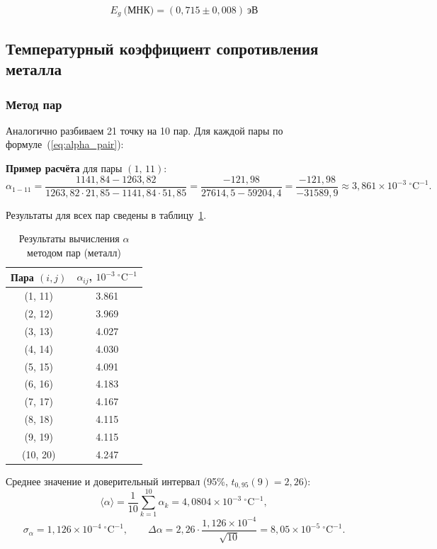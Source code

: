\documentclass[a4paper,14pt]{article}
\begin{document}
\[
    \boxed{E_g\ \text{(МНК)} = (0{,}715 \pm 0{,}008)\ \text{эВ}}
\]

\subsection{Температурный коэффициент сопротивления металла}

\subsubsection*{Метод пар}

Аналогично разбиваем 21 точку на 10 пар. Для каждой пары по формуле~(\ref{eq:alpha_pair}):

\textbf{Пример расчёта} для пары $(1,\,11)$:
\[
    \alpha_{1{-}11} = \frac{1141{,}84 - 1263{,}82}{1263{,}82 \cdot 21{,}85 - 1141{,}84 \cdot 51{,}85}
    = \frac{-121{,}98}{27614{,}5 - 59204{,}4}
    = \frac{-121{,}98}{-31589{,}9}
    \approx 3{,}861\times10^{-3}\ ^{\circ}\mathrm{C}^{-1}.
\]

Результаты для всех пар сведены в таблицу~\ref{tab:alpha_pairs}.

\begin{table}[H]
\centering
\caption{Результаты вычисления $\alpha$ методом пар (металл)}
\label{tab:alpha_pairs}
\begin{tabular}{|c|c|}
\hline
Пара $(i,j)$ & $\alpha_{ij}$, $10^{-3}\ ^{\circ}\mathrm{C}^{-1}$ \\
\hline
(1, 11)  & 3.861 \\
(2, 12)  & 3.969 \\
(3, 13)  & 4.027 \\
(4, 14)  & 4.030 \\
(5, 15)  & 4.091 \\
(6, 16)  & 4.183 \\
(7, 17)  & 4.167 \\
(8, 18)  & 4.115 \\
(9, 19)  & 4.115 \\
(10, 20) & 4.247 \\
\hline
\end{tabular}
\end{table}

Среднее значение и доверительный интервал (95\%, $t_{0{,}95}(9) = 2{,}26$):
\[
    \langle\alpha\rangle = \frac{1}{10}\sum_{k=1}^{10}\alpha_k
    = 4{,}0804\times10^{-3}\ ^{\circ}\mathrm{C}^{-1},
\]
\[
    \sigma_\alpha = 1{,}126\times10^{-4}\ ^{\circ}\mathrm{C}^{-1},
    \qquad
    \Delta\alpha = 2{,}26 \cdot \frac{1{,}126\times10^{-4}}{\sqrt{10}}
    = 8{,}05\times10^{-5}\ ^{\circ}\mathrm{C}^{-1}.
\]
\end{document}
